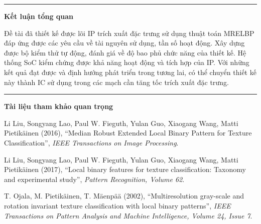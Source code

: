 \noindent\rule{\linewidth}{0.5pt} %

\vspace{0.5em} %
\noindent\textbf{\hspace{0.5em} Kết luận tổng quan}

Đề tài đã thiết kế được lõi IP trích xuất đặc trưng sử dụng thuật toán MRELBP đáp ứng được các yêu cầu về tài nguyên sử dụng, tần số hoạt động. Xây dựng được bộ kiểm thử tự động, đánh giá về độ bao phủ chức năng của thiết kế. Hệ thống SoC kiểm chứng được khả năng hoạt động và tích hợp của IP. Với những kết quả đạt được và định hướng phát triển trong tương lai, có thể chuyển thiết kế này thành IC sử dụng trong các mạch cần tăng tốc trích xuất đặc trưng. 


\noindent\rule{\linewidth}{0.5pt} %

\vspace{0.5em} %
\noindent\textbf{\hspace{0.5em} Tài liệu tham khảo quan trọng}


Li Liu, Songyang Lao, Paul W. Fieguth, Yulan Guo, Xiaogang Wang, Matti Pietikäinen (2016),
``Median Robust Extended Local Binary Pattern for Texture Classification'', \emph{IEEE Transactions on Image Processing}.

Li Liu, Songyang Lao, Paul W. Fieguth, Yulan Guo, Xiaogang Wang, Matti Pietikäinen (2017),
``Local binary features for texture classification: Taxonomy and experimental study'', \emph{Pattern Recognition, Volume 62}.

T. Ojala, M. Pietikäinen, T. Mäenpää (2002), ``Multiresolution gray-scale and rotation invariant texture classification with local binary patterns'',
\emph{IEEE Transactions on Pattern Analysis and Machine Intelligence, Volume 24, Issue 7}.




